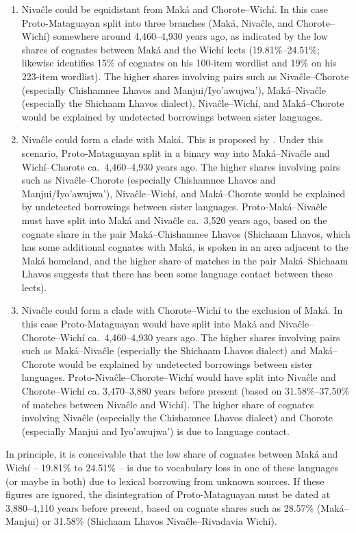 \begin{enumerate}
    \item Nivaĉle could be equidistant from Maká and Chorote--Wichí. In this case Proto-Mataguayan split into three branches (Maká, Nivaĉle, and Chorote--Wichí) somewhere around 4,460--4,930 years ago, as indicated by the low shares of cognates between Maká and the Wichí lects (19.81\%--24.51\%;  likewise identifies 15\% of cognates on his 100-item wordlist and 19\% on his 223-item wordlist). The higher shares involving pairs such as Nivaĉle--Chorote (especially Chishamnee Lhavos and Manjui/Iyo’awujwa’), Maká--Nivaĉle (especially the Shichaam Lhavos dialect), Nivaĉle--Wichí, and Maká--Chorote would be explained by undetected borrowings between sister languages.
    \item Nivaĉle could form a clade with Maká. This is proposed by \citet[296]{AF05,LC-VG-07,PVB13a}. Under this scenario, Proto-Mataguayan split in a binary way into Maká--Nivaĉle and Wichí--Chorote ca.~4,460--4,930 years ago. The higher shares involving pairs such as Nivaĉle--Chorote (especially Chishamnee Lhavos and Manjui/Iyo’awujwa’), Nivaĉle--Wichí, and Maká--Chorote would be explained by undetected borrowings between sister languages. Proto-Maká--Nivaĉle must have split into Maká and Nivaĉle ca.~3,520 years ago, based on the cognate share in the pair Maká--Chishamnee Lhavos (Shichaam Lhavos, which has some additional cognates with Maká, is spoken in an area adjacent to the Maká homeland, and the higher share of matches in the pair Maká--Shichaam Lhavos suggests that there has been some language contact between these lects).
    \item Nivaĉle could form a clade with Chorote--Wichí to the exclusion of Maká. In this case Proto-Mataguayan would have split into Maká and Nivaĉle--Chorote--Wichí ca.~4,460--4,930 years ago. The higher shares involving pairs such as Maká--Nivaĉle (especially the Shichaam Lhavos dialect) and Maká--Chorote would be explained by undetected borrowings between sister languages. Proto-Nivaĉle--Chorote--Wichí would have split into Nivaĉle and Chorote--Wichí ca. 3,470--3,880 years before present (based on 31.58\%--37.50\% of matches between Nivaĉle and Wichí). The higher share of cognates involving Nivaĉle (especially the Chishamnee Lhavos dialect) and Chorote (especially Manjui and Iyo’awujwa’) is due to language contact.
\end{enumerate}

In principle, it is conceivable that the low share of cognates between Maká and Wichí -- 19.81\% to 24.51\% -- is due to vocabulary loss in one of these languages (or maybe in both) due to lexical borrowing from unknown sources. If these figures are ignored, the disintegration of Proto-Mataguayan must be dated at 3,880--4,110 years before present, based on cognate shares such as 28.57\% (Maká--Manjui) or 31.58\% (Shichaam Lhavos Nivaĉle--Rivadavia Wichí).

